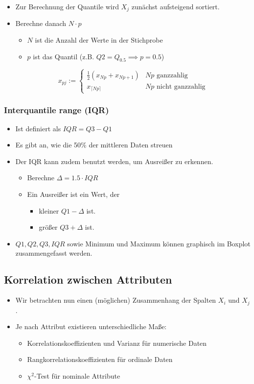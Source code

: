 \documentclass{scrartcl}
\begin{document}
\begin{itemize}
	\item Zur Berechnung der Quantile wird $ X_j $ zunächst aufsteigend 
	sortiert.
	\item Berechne danach $ N \cdot p $
	\begin{itemize}
		\item $ N $ ist die Anzahl der Werte in der Stichprobe
		\item $ p $ ist das Quantil (z.B. $ Q2 = Q_{0.5} \implies p = 0.5 $)
	\end{itemize}
	\[ x_{pj} := \begin{cases}
		\frac{1}{2} (x_{Np} + x_{Np+1}) & Np \text{ ganzzahlig} \\
		x_{\lceil Np \rceil} & Np \text{ nicht ganzzahlig}
	\end{cases} \]
\end{itemize}

\subsubsection{Interquantile range (IQR)}

\begin{itemize}
	\item Ist definiert als $ IQR = Q3 - Q1 $
	\item Es gibt an, wie die 50\% der mittleren Daten streuen
	\item Der IQR kann zudem benutzt werden, um Ausreißer zu erkennen.
	\begin{itemize}
		\item Berechne $ \Delta = 1.5 \cdot IQR $
		\item Ein Ausreißer ist ein Wert, der
		\begin{itemize}
			\item kleiner $ Q1 - \Delta $ ist.
			\item größer $ Q3 + \Delta $ ist.
		\end{itemize}
	\end{itemize}
	\item $ Q1,Q2,Q3,IQR $ sowie Minimum und Maximum können graphisch im 
	Boxplot zusammengefasst werden.
\end{itemize}

\subsection{Korrelation zwischen Attributen}

\begin{itemize}
	\item Wir betrachten nun einen (möglichen) Zusammenhang der Spalten $ X_i $ 
	und $ X_j $.
	\item Je nach Attribut existieren unterschiedliche Maße:
	\begin{itemize}
		\item Korrelationskoeffizienten und Varianz für numerische Daten
		\item Rangkorrelationskoeffizienten für ordinale Daten
		\item $ \chi^2 $-Test für nominale Attribute
	\end{itemize}
\end{itemize}
\end{document}
